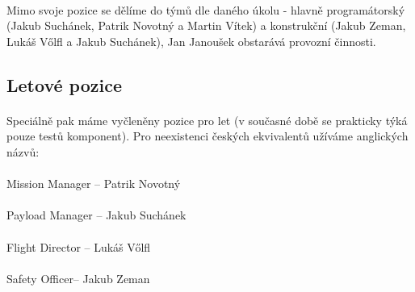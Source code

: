 \documentclass[a4paper]{report}
\begin{document}
\paragraph{} Mimo svoje pozice se dělíme do týmů dle daného úkolu - hlavně programátorský (Jakub Suchánek, Patrik Novotný a Martin Vítek) a konstrukční (Jakub Zeman, Lukáš Vőlfl a Jakub Suchánek), Jan Janoušek obstarává provozní činnosti.
\subsection{Letové pozice}
\paragraph{} Speciálně pak máme vyčleněny pozice pro let (v současné době se prakticky týká pouze testů komponent). Pro neexistenci českých ekvivalentů užíváme anglických názvů:
\paragraph{} Mission Manager – Patrik Novotný
\paragraph{} Payload Manager – Jakub Suchánek
\paragraph{} Flight Director – Lukáš Vőlfl
\paragraph{} Safety Officer– Jakub Zeman
\end{document}
